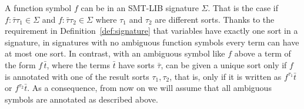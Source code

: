 
A function symbol $f$ can be 
in an SMT-LIB signature $\Sigma$.
That is the case if $f:\bar{\tau}\tau_1 \in \Sigma$ and $f:\bar{\tau}\tau_2 \in \Sigma$ 
where $\tau_1$ and $\tau_2$ are different sorts.
Thanks to the requirement in Definition~\ref{def:signature} that
variables have exactly one sort in a signature,
in signatures with no ambiguous function symbols
every term can have at most one sort.
In contrast,
with an ambiguous symbol like $f$ above
a term of the form $f\, \bar{t}$,
where the terms $\bar t$ have sorts $\bar \tau$, can be given 
a unique sort only if $f$ is annotated with one of the result sorts $\tau_1, \tau_2$,
that is, only if it is written as $f^{\tau_1}\bar{t}$ or $f^{\tau_2}\bar{t}$. 
As a consequence, from now on we will assume 
that all ambiguous symbols are annotated as  described above.





